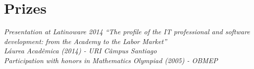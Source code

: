 \documentclass[10pt]{article} %
\begin{document}


\section{Prizes}

{
\textit{Presentation at Latinoware 2014 “The profile of the IT professional and software development: from the Academy to the Labor Market”}\\
\textit{Láurea Acadêmica (2014) - URI Câmpus Santiago}\\
\textit{Participation with honors in Mathematics Olympiad (2005) - OBMEP}\\
}

\end{document}
